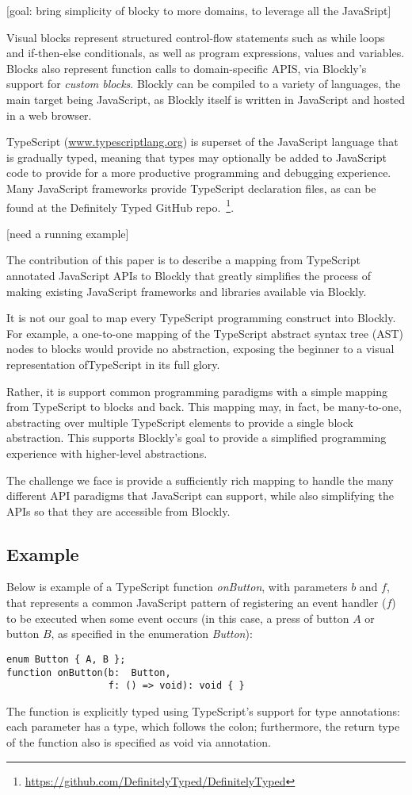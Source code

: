 [goal: bring simplicity of blocky to more domains, to leverage all the JavaSript]

Visual blocks represent structured control-flow statements such as while loops 
and if-then-else conditionals, as well as program expressions, values and variables. 
Blocks also represent function calls to domain-specific APIS, via Blockly's support for \emph{custom 
blocks}. Blockly can be compiled to a variety of languages, the main target 
being JavaScript, as Blockly itself is written in JavaScript and hosted in a web browser.

TypeScript (\url{www.typescriptlang.org}) is superset of the JavaScript language that is gradually typed, 
meaning that types may optionally be added to JavaScript code to provide for a more productive programming 
and debugging experience.  Many JavaScript frameworks provide TypeScript declaration files, as
can be found at the Definitely Typed GitHub repo.~\footnote{\url{https://github.com/DefinitelyTyped/DefinitelyTyped}}.

[need a running example]

The contribution of this paper is to describe a mapping from TypeScript annotated 
JavaScript APIs to Blockly that greatly simplifies 
the process of making existing JavaScript frameworks and libraries available via Blockly.

It is not our goal to map every TypeScript programming construct into Blockly.
For example, a one-to-one mapping of the TypeScript abstract syntax tree (AST) 
nodes to blocks would provide no abstraction, exposing the beginner to a visual 
representation ofTypeScript in its full glory.

Rather, it is support common programming paradigms with a simple mapping
from TypeScript to blocks and back.  This mapping may, in fact, be many-to-one, 
abstracting over multiple TypeScript elements to provide a single block abstraction.
This supports Blockly's goal to provide a simplified programming experience 
with higher-level abstractions. 

The challenge we face is provide a sufficiently rich mapping to handle the
many different API paradigms that JavaScript can support, while
also simplifying the APIs so that they are accessible from Blockly. 

\subsection{Example}

Below is example of a TypeScript function \emph{onButton},
with parameters $b$ and $f$,
that represents a common JavaScript pattern of registering an event
handler ($f$) to be executed when some event occurs (in this case, 
a press of button $A$ or button $B$, as specified in the enumeration
\emph{Button}):
\begin{lstlisting}
enum Button { A, B };
function onButton(b:  Button, 
                  f: () => void): void { }
\end{lstlisting}
The function is explicitly typed using TypeScript's support for
type annotations: each parameter has a type, which follows the colon;
furthermore, the return type of the function also is specified as void
via annotation. 

